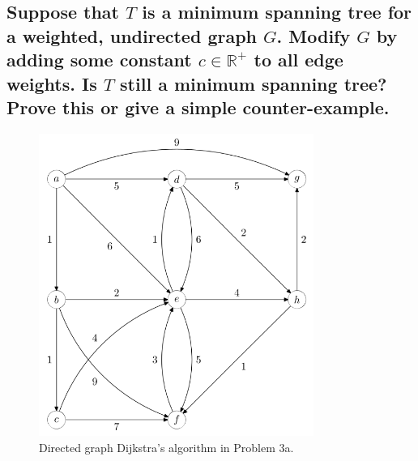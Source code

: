 \documentclass[a4paper,12pt]{article}
\begin{document}
\subsection{Suppose that $T$ is a minimum spanning tree for a weighted, undirected graph $G$. Modify $G$ by adding some constant $c \in \mathbb{R}^+$ to all edge weights. Is $T$ still a minimum spanning tree? Prove this or give a simple counter-example.}



\begin{figure}[H]
    \centering
    \includegraphics[width=0.8\textwidth]{3.png}
    \caption{Directed graph Dijkstra's algorithm in Problem 3a.}
\end{figure}
\end{document}
